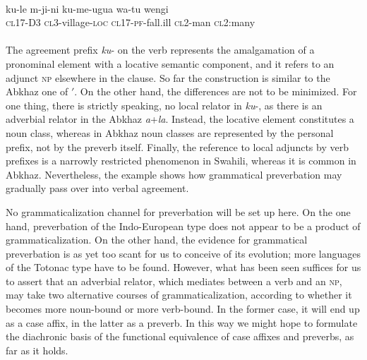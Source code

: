 \ea\label{ex:E84}
\\
\gll    ku-le  m-ji-ni  ku-me-ugua  wa-tu  wengi\\
 \textsc{cl}17-D3  \textsc{cl}3-village-\textsc{loc}  \textsc{cl}17-\textsc{pf}-fall.ill  \textsc{cl}2-man  \textsc{cl}2:many\footnotemark{}\\
\\
\z
\noindent The agreement prefix \textit{ku}{}- on the verb represents the amalgamation of a pronominal element with a locative semantic component, and it refers to an adjunct \textsc{np} elsewhere in the clause. So far the construction is similar to the Abkhaz one of $'$. On the other hand, the differences are not to be minimized. For one thing, there is strictly speaking, no local relator in \textit{ku}{}-, as there is an adverbial relator in the Abkhaz \textit{a}+\textit{la}. Instead, the locative element constitutes a noun class, whereas in Abkhaz noun classes are represented by the personal prefix, not by the preverb itself. Finally, the reference to local adjuncts by verb prefixes is a narrowly restricted phenomenon in Swahili, whereas it is common in Abkhaz. Nevertheless, the example shows how grammatical preverbation may gradually pass over into verbal agreement.

No grammaticalization channel for preverbation will be set up here. On the one hand, preverbation of the Indo-European type does not appear to be a product of grammaticalization. On the other hand, the evidence for grammatical preverbation is as yet too scant for us to conceive of its evolution; more languages of the Totonac type have to be found. However, what has been seen suffices for us to assert that an adverbial relator, which mediates between a verb and an \textsc{np}, may take two alternative courses of grammaticalization, according to whether it becomes more noun-bound or more verb-bound. In the former case, it will end up as a case affix, in the latter as a preverb. In this way we might hope to formulate the diachronic basis of the functional equivalence of case affixes and preverbs, as far as it holds.

